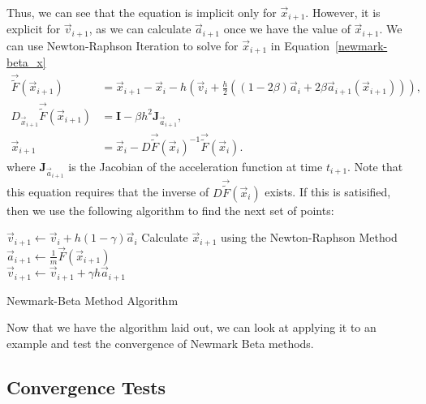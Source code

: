 \documentclass[../Main.tex]{subfiles}
\begin{document}
Thus, we can see that the equation is implicit only for $\vec{x}_{i+1}$. However, it is explicit for $\vec{v}_{i+1}$, as we can calculate $\vec{a}_{i+1}$ once we have the value of $\vec{x}_{i+1}$.  We can use Newton-Raphson Iteration to solve for $\vec{x}_{i+1}$ in Equation~\ref{newmark-beta_x}
\begin{align}
	\vec{\tilde{F}}\left(\vec{x}_{i+1}\right) & = \vec{x}_{i+1} - \vec{x}_{i} -h\left(\vec{v}_{i} + \frac{h}{2}\left(\left(1-2\beta\right)\vec{a}_{i} + 2\beta\vec{a}_{i+1}\left(\vec{x}_{i+1}\right)\right)\right), \nonumber \\
	D_{\vec{x}_{i+1}}\vec{\tilde{F}}\left(\vec{x}_{i+1}\right) & = \textbf{I} -  \beta h^{2}\textbf{J}_{\vec{a}_{i+1}},\nonumber \\
	\vec{x}_{i+1} & = \vec{x}_{i} - D\vec{\tilde{F}}\left(\vec{x}_{i}\right)^{-1}\vec{\tilde{F}}\left(\vec{x}_{i}\right). \label{eqn:newton-raphson_final_step}
\end{align}
where $\textbf{J}_{\vec{a}_{i+1}}$ is the Jacobian of the acceleration function at time $t_{i+1}$. Note that this equation requires that the inverse of $D\vec{\tilde{F}}\left(\vec{x}_{i}\right)$ exists. If this is satisified, then we use the following algorithm to find the next set of points: \\

\begin{algorithm}[H]
\SetAlgoLined
{}

\BlankLine

$\vec{v}_{i+1} \leftarrow \vec{v}_{i} + h\left(1-\gamma\right)\vec{a}_{i}$ 
Calculate $\vec{x}_{i+1}$ using the Newton-Raphson Method \\
$\vec{a}_{i+1} \leftarrow \frac{1}{m}\vec{F}\left(\vec{x}_{i+1}\right)$\\ 
$\vec{v}_{i+1} \leftarrow \vec{v}_{i+1} + \gamma h\vec{a}_{i+1}$ 
\caption{Newmark-Beta Method Algorithm}
\label{algorithm:newmark-beta}
\end{algorithm}
\BlankLine

Now that we have the algorithm laid out, we can look at applying it to an example and test the convergence of Newmark Beta methods.
\subsection{Convergence Tests}
\end{document}
